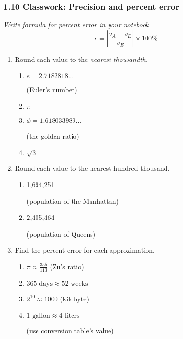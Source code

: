 

\fancyhead[LE]{\thepage}



\subsubsection*{1.10 Classwork: Precision and percent error}
\emph{Write formula for percent error in your notebook}
$$\epsilon = \left|\frac{v_A-v_E}{v_E}\right| \times 100\%$$
\begin{enumerate}
\item Round each value to the \emph{nearest thousandth}.
  \begin{multicols}{2}
    \begin{enumerate}
      \item $e=2.7182818...$ \par (Euler's number)
      \item $\pi$
      \item $\phi = 1.618033989...$ \par (the golden ratio)
      \item $\sqrt{3}$
    \end{enumerate}
  \end{multicols} \bigskip 

\item Round each value to the nearest hundred thousand.
  \begin{multicols}{2}
    \begin{enumerate}
      \item 1,694,251 \par \bigskip (population of the Manhattan)
      \item 2,405,464 \par \bigskip (population of Queens)
    \end{enumerate}
  \end{multicols}

\item Find the percent error for each approximation.
  \begin{multicols}{2}
    \begin{enumerate}[itemsep=4cm]
      \item $\displaystyle \pi \approx \frac{355}{113}$ (\href{https://en.wikipedia.org/wiki/Zu_Chongzhi}{Zu's ratio})
      \item $365 \text{ days} \approx 52 \text{ weeks}$
      \item $2^{10} \approx 1000$ (kilobyte)
      \item $1 \text{ gallon} \approx 4 \text{ liters}$ \par (use conversion table's value)    
    \end{enumerate}
  \end{multicols}


\end{enumerate}
